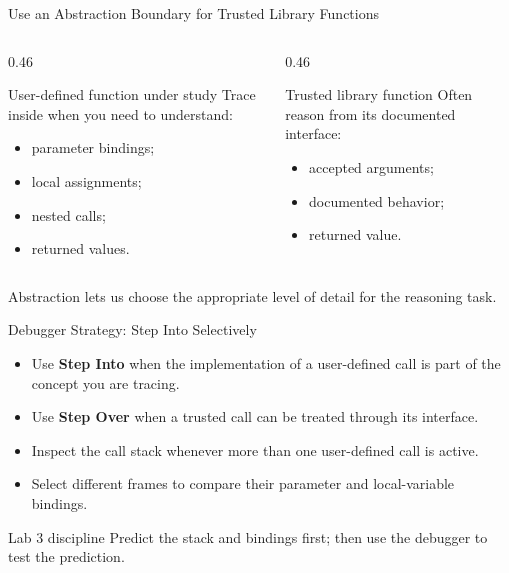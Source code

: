 \documentclass[aspectratio=169,10pt]{beamer}
\begin{document}
\begin{frame}{Use an Abstraction Boundary for Trusted Library Functions}
  \begin{columns}[T,onlytextwidth]
    \begin{column}{0.46\textwidth}
      \begin{block}{User-defined function under study}
        Trace inside when you need to understand:
        \begin{itemize}
          \item parameter bindings;
          \item local assignments;
          \item nested calls;
          \item returned values.
        \end{itemize}
      \end{block}
    \end{column}

    \begin{column}{0.46\textwidth}
      \begin{block}{Trusted library function}
        Often reason from its documented interface:
        \begin{itemize}
          \item accepted arguments;
          \item documented behavior;
          \item returned value.
        \end{itemize}
      \end{block}
    \end{column}
  \end{columns}

  \begin{keyidea}
    Abstraction lets us choose the appropriate level of detail for the reasoning task.
  \end{keyidea}
\end{frame}

\begin{frame}{Debugger Strategy: Step Into Selectively}
  \begin{itemize}
    \item Use \textbf{Step Into} when the implementation of a user-defined call is part of the concept you are tracing.
    \item Use \textbf{Step Over} when a trusted call can be treated through its interface.
    \item Inspect the call stack whenever more than one user-defined call is active.
    \item Select different frames to compare their parameter and local-variable bindings.
  \end{itemize}

  \begin{block}{Lab 3 discipline}
    Predict the stack and bindings first; then use the debugger to test the prediction.
  \end{block}
\end{frame}
\end{document}
